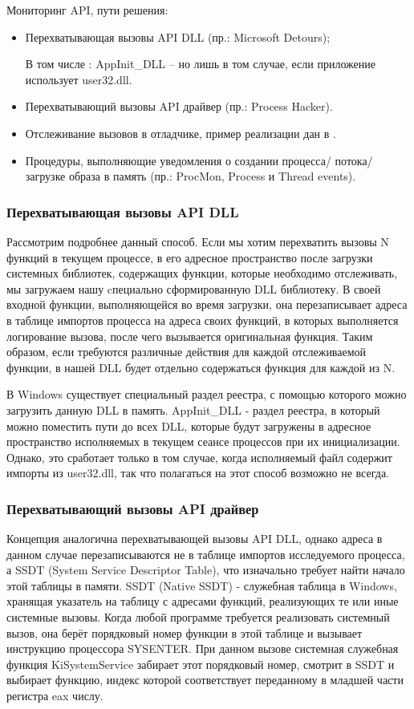 Мониторинг API, пути решения:
\begin {itemize}
	\item Перехватывающая вызовы API DLL (пр.: Microsoft Detours);

	В том числе : AppInit\_DLL – но лишь в том случае, если приложение использует user32.dll.
	\item Перехватывающий вызовы API драйвер (пр.: Process Hacker).
	\item Отслеживание вызовов в отладчике, пример реализации дан в \cite{MALWAREBOOK}.
	\item Процедуры, выполняющие уведомления о создании процесса/ потока/ загрузке образа в память (пр.:
 	ProcMon, Process и Thread events).
\end {itemize}

\subsubsection {Перехватывающая вызовы API DLL}
Рассмотрим подробнее данный способ. Если мы хотим перехватить вызовы N функций в текущем процессе,
 в его адресное пространство после загрузки системных библиотек, содержащих функции, которые необходимо
 отслеживать, мы загружаем нашу cпециально сформированную DLL библиотеку. В своей входной функции,
 выполняющейся во время загрузки, она перезаписывает адреса в таблице импортов процесса на адреса своих
 функций, в которых выполняется логирование вызова, после чего вызывается оригинальная функция. Таким образом, если требуются различные действия для каждой отслеживаемой функции, в нашей DLL будет отдельно
 содержаться функция для каждой из N.
 
В Windows существует специальный раздел реестра, с помощью которого можно загрузить данную DLL в память. AppInit\_DLL - раздел реестра, в который можно поместить пути до всех DLL, которые будут загружены в адресное пространство исполняемых в текущем сеансе процессов при их инициализации. Однако, это сработает только в том случае, когда исполняемый файл содержит импорты из user32.dll, так что полагаться на этот способ возможно не всегда.
\subsubsection {Перехватывающий вызовы API драйвер}
 Концепция аналогична перехватывающей вызовы API DLL, однако адреса в данном случае перезаписываются не в таблице импортов исследуемого процесса, а SSDT (System Service Descriptor Table), что изначально требует найти начало этой таблицы в памяти. SSDT (Native SSDT) - служебная таблица в Windows, хранящая указатель на таблицу с адресами функций, реализующих те или иные системные вызовы. Когда любой программе требуется реализовать системный вызов, она берёт порядковый номер функции в этой таблице и вызывает инструкцию процессора SYSENTER.  При данном вызове системная служебная функция KiSystemService забирает этот порядковый номер, смотрит в SSDT и выбирает функцию, индекс которой соответствует переданному в младшей части регистра eax числу.

